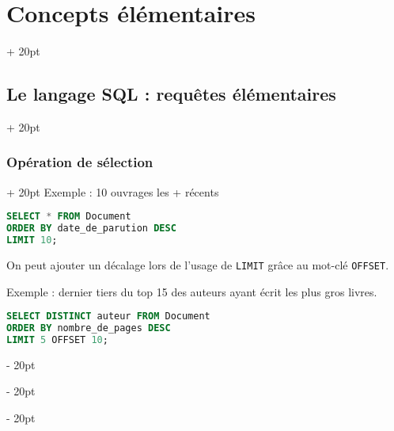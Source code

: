 \documentclass[a4paper, 12pt, twoside]{article}
\newcommand{\ind}[1][20pt]{\advance\leftskip + #1}
\newcommand{\deind}[1][20pt]{\advance\leftskip - #1}
\newenvironment{indt}[2][20pt]{#2 \par \ind[#1]}{\par \deind} %
\begin{document}
\begin{indt}{\section{Concepts élémentaires}}
\begin{indt}{\subsection{Le langage SQL : requêtes élémentaires}}
\begin{indt}{\subsubsection{Opération de sélection}}
                Exemple : 10 ouvrages les + récents

                \begin{lstlisting}[language=SQL, xleftmargin=80pt]
SELECT * FROM Document
ORDER BY date_de_parution DESC
LIMIT 10;\end{lstlisting}

                On peut ajouter un décalage lors de l'usage de \texttt{LIMIT} grâce au mot-clé \texttt{OFFSET}.

                Exemple : dernier tiers du top 15 des auteurs ayant écrit les plus gros livres.

                \begin{lstlisting}[language=SQL, xleftmargin=80pt]
SELECT DISTINCT auteur FROM Document
ORDER BY nombre_de_pages DESC
LIMIT 5 OFFSET 10;\end{lstlisting}
            \end{indt}
        \end{indt}
        
    \end{indt}

    \vspace{12pt}
    
\end{document}
